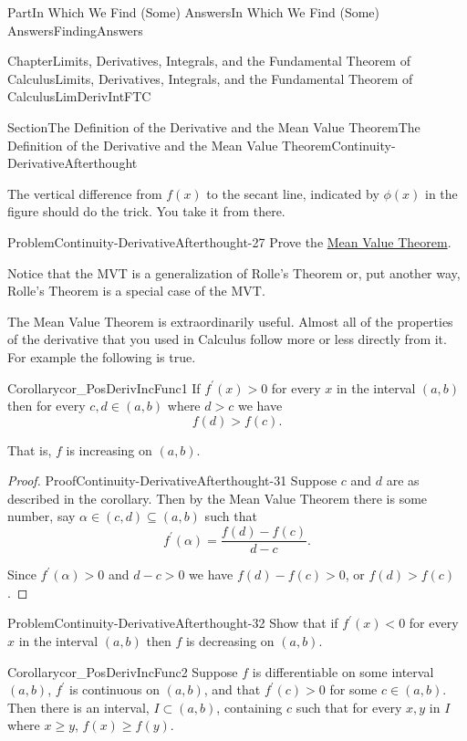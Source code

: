 \documentclass[oneside,10pt,]{book}
\numberwithin{equation}{part}
\newcommand{\lt}{<}
\begin{document}
\begin{partptx}{Part}{In Which We Find (Some) Answers}{}{In Which We Find (Some) Answers}{}{}{FindingAnswers}
\begin{chapterptx}{Chapter}{Limits, Derivatives, Integrals, and the Fundamental Theorem of Calculus}{}{Limits, Derivatives, Integrals, and the Fundamental Theorem of Calculus}{}{}{LimDerivIntFTC}
\begin{sectionptx}{Section}{The Definition of  the Derivative and the Mean Value Theorem}{}{The Definition of  the Derivative and the Mean Value Theorem}{}{}{Continuity-DerivativeAfterthought}
\begin{image}{0.3}{0.4}{0.3}{}
\end{image}%
The vertical difference from \(f(x)\) to the secant line, indicated by \(\phi(x)\) in the figure should do the trick.  You take it from there.%
\begin{problem}{Problem}{}{Continuity-DerivativeAfterthought-27}%
Prove the \hyperref[thm_MVT]{Mean Value Theorem}.%
\end{problem}
Notice that the MVT is a generalization of Rolle's Theorem or, put another way, Rolle's Theorem is a special case of the  MVT.%
\par
The Mean Value Theorem is extraordinarily useful.  Almost all of the properties of the derivative that you used in Calculus follow more or less directly from it.  For example the following is true.%
\begin{corollary}{Corollary}{}{}{cor_PosDerivIncFunc1}%
If \(f^\prime(x) > 0\) for every \(x\) in the interval \((a,b)\) then for every \(c,d\in(a,b)\) where \(d>c\) we have%
\begin{equation*}
f(d) > f(c) \text{.}
\end{equation*}
%
\par
That is, \(f\) is increasing on \((a,b)\).%
\end{corollary}
\begin{proof}{Proof}{}{Continuity-DerivativeAfterthought-31}
Suppose \(c\) and \(d\) are as described in the corollary. Then by the Mean Value Theorem there is some number, say \(\alpha\in(c,d)\subseteq(a,b)\) such that%
\begin{equation*}
f^\prime(\alpha)=\frac{f(d)-f(c)}{d-c} \text{.}
\end{equation*}
%
\par
Since \(f^\prime(\alpha)>0\) and \(d-c>0\) we have \(f(d)-f(c)>0\), or \(f(d)>f(c)\).%
\end{proof}
\begin{problem}{Problem}{}{Continuity-DerivativeAfterthought-32}%
Show that if \(f^\prime(x) \lt 0\) for every \(x\) in the interval \((a,b)\) then \(f\) is decreasing on \((a,b)\).%
\end{problem}
\begin{corollary}{Corollary}{}{}{cor_PosDerivIncFunc2}%
Suppose \(f\) is differentiable on some interval \((a,b)\), \(f^\prime\) is continuous on \((a,b)\), and that \(f^\prime(c)>0\) for some \(c\in (a,b)\). Then there is an interval, \(I\subset (a,b)\), containing \(c\) such that for every \(x, y\) in \(I\) where \(x\ge y\), \(f(x)\ge f(y)\).%
\end{corollary}

\end{sectionptx}
\end{chapterptx}
\end{partptx}
\end{document}
